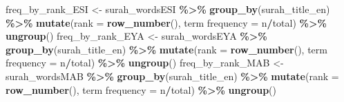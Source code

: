 \documentclass[
]{article}
\newenvironment{Shaded}{\begin{snugshade}}{\end{snugshade}}
\newcommand{\AttributeTok}[1]{\textcolor[rgb]{0.13,0.29,0.53}{#1}}
\newcommand{\FunctionTok}[1]{\textcolor[rgb]{0.13,0.29,0.53}{\textbf{#1}}}
\newcommand{\NormalTok}[1]{#1}
\newcommand{\OtherTok}[1]{\textcolor[rgb]{0.56,0.35,0.01}{#1}}
\newcommand{\SpecialCharTok}[1]{\textcolor[rgb]{0.81,0.36,0.00}{\textbf{#1}}}
\newcommand{\StringTok}[1]{\textcolor[rgb]{0.31,0.60,0.02}{#1}}
\begin{document}
\begin{Shaded}
\begin{Highlighting}[]
\NormalTok{freq\_by\_rank\_ESI }\OtherTok{\textless{}{-}}\NormalTok{ surah\_wordsESI }\SpecialCharTok{\%\textgreater{}\%} 
  \FunctionTok{group\_by}\NormalTok{(surah\_title\_en) }\SpecialCharTok{\%\textgreater{}\%} 
  \FunctionTok{mutate}\NormalTok{(}\AttributeTok{rank =} \FunctionTok{row\_number}\NormalTok{(), }
         \StringTok{\textasciigrave{}}\AttributeTok{term frequency}\StringTok{\textasciigrave{}} \OtherTok{=}\NormalTok{ n}\SpecialCharTok{/}\NormalTok{total) }\SpecialCharTok{\%\textgreater{}\%}
  \FunctionTok{ungroup}\NormalTok{()}
\NormalTok{freq\_by\_rank\_EYA }\OtherTok{\textless{}{-}}\NormalTok{ surah\_wordsEYA }\SpecialCharTok{\%\textgreater{}\%} 
  \FunctionTok{group\_by}\NormalTok{(surah\_title\_en) }\SpecialCharTok{\%\textgreater{}\%} 
  \FunctionTok{mutate}\NormalTok{(}\AttributeTok{rank =} \FunctionTok{row\_number}\NormalTok{(), }
         \StringTok{\textasciigrave{}}\AttributeTok{term frequency}\StringTok{\textasciigrave{}} \OtherTok{=}\NormalTok{ n}\SpecialCharTok{/}\NormalTok{total) }\SpecialCharTok{\%\textgreater{}\%}
  \FunctionTok{ungroup}\NormalTok{()}
\NormalTok{freq\_by\_rank\_MAB }\OtherTok{\textless{}{-}}\NormalTok{ surah\_wordsMAB }\SpecialCharTok{\%\textgreater{}\%} 
  \FunctionTok{group\_by}\NormalTok{(surah\_title\_en) }\SpecialCharTok{\%\textgreater{}\%} 
  \FunctionTok{mutate}\NormalTok{(}\AttributeTok{rank =} \FunctionTok{row\_number}\NormalTok{(), }
         \StringTok{\textasciigrave{}}\AttributeTok{term frequency}\StringTok{\textasciigrave{}} \OtherTok{=}\NormalTok{ n}\SpecialCharTok{/}\NormalTok{total) }\SpecialCharTok{\%\textgreater{}\%}
  \FunctionTok{ungroup}\NormalTok{()}


\end{Highlighting}
\end{Shaded}
\end{document}
